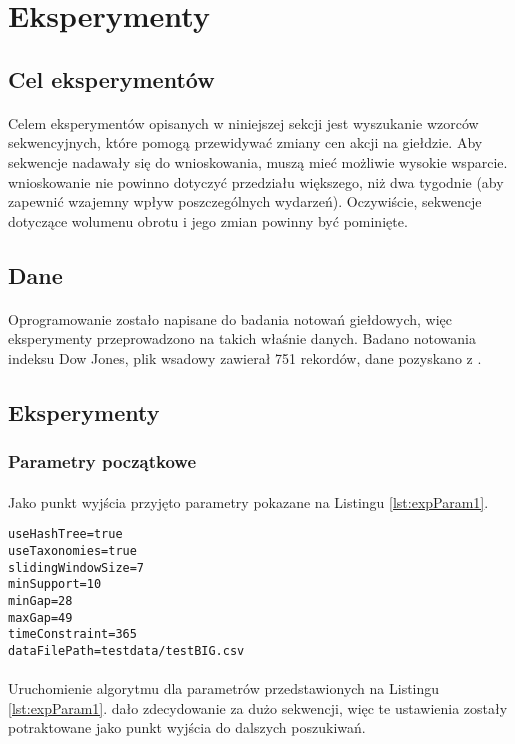 \documentclass[11pt,a4paper]{article}
\begin{document}
\section{Eksperymenty}
\subsection{Cel eksperymentów}
\paragraph{}Celem eksperymentów opisanych w niniejszej sekcji jest wyszukanie wzorców sekwencyjnych, które pomogą przewidywać zmiany cen akcji na giełdzie. Aby sekwencje nadawały się do wnioskowania, muszą mieć możliwie wysokie wsparcie. wnioskowanie nie powinno dotyczyć przedziału większego, niż dwa tygodnie (aby zapewnić wzajemny wpływ poszczególnych wydarzeń). Oczywiście, sekwencje dotyczące wolumenu obrotu i jego zmian powinny być pominięte.
\subsection{Dane}
\paragraph{}Oprogramowanie zostało napisane do badania notowań giełdowych, więc eksperymenty przeprowadzono na takich właśnie danych. Badano notowania indeksu Dow Jones, plik wsadowy zawierał 751 rekordów, dane pozyskano z \cite{bib:DowJones}.
\subsection{Eksperymenty}
\subsubsection{Parametry początkowe}
\paragraph{}Jako punkt wyjścia przyjęto parametry pokazane na Listingu \ref{lst:expParam1}.
\begin{lstlisting}[caption={Parametry początkowe},label={lst:expParam1}]
useHashTree=true
useTaxonomies=true
slidingWindowSize=7
minSupport=10
minGap=28
maxGap=49
timeConstraint=365
dataFilePath=testdata/testBIG.csv
\end{lstlisting}
\paragraph{}Uruchomienie algorytmu dla parametrów przedstawionych na Listingu \ref{lst:expParam1}. dało zdecydowanie za dużo sekwencji, więc te ustawienia zostały potraktowane jako punkt wyjścia do dalszych poszukiwań.
\end{document}
